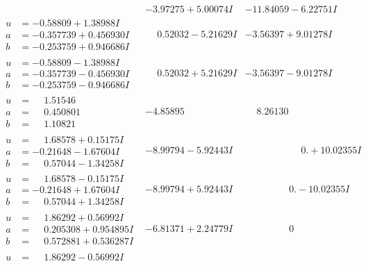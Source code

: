\documentclass[1p]{elsarticle_modified}
\theoremstyle{definition}
\begin{document}
$$\begin{array}{c|c|c}
 & -3.97275 + 5.00074 I & -11.84059 - 6.22751 I \\ \hline\begin{aligned}
u &= -0.58809 + 1.38988 I \\
a &= -0.357739 + 0.456930 I \\
b &= -0.253759 + 0.946686 I\end{aligned}
 & \phantom{-}0.52032 - 5.21629 I & -3.56397 + 9.01278 I \\ \hline\begin{aligned}
u &= -0.58809 - 1.38988 I \\
a &= -0.357739 - 0.456930 I \\
b &= -0.253759 - 0.946686 I\end{aligned}
 & \phantom{-}0.52032 + 5.21629 I & -3.56397 - 9.01278 I \\ \hline\begin{aligned}
u &= \phantom{-}1.51546\phantom{ +0.000000I} \\
a &= \phantom{-}0.450801\phantom{ +0.000000I} \\
b &= \phantom{-}1.10821\phantom{ +0.000000I}\end{aligned}
 & -4.85895\phantom{ +0.000000I} & \phantom{-}8.26130\phantom{ +0.000000I} \\ \hline\begin{aligned}
u &= \phantom{-}1.68578 + 0.15175 I \\
a &= -0.21648 - 1.67604 I \\
b &= \phantom{-}0.57044 - 1.34258 I\end{aligned}
 & -8.99794 - 5.92443 I & \phantom{-0.000000 -}0. + 10.02355 I \\ \hline\begin{aligned}
u &= \phantom{-}1.68578 - 0.15175 I \\
a &= -0.21648 + 1.67604 I \\
b &= \phantom{-}0.57044 + 1.34258 I\end{aligned}
 & -8.99794 + 5.92443 I & \phantom{-0.000000 } 0. - 10.02355 I \\ \hline\begin{aligned}
u &= \phantom{-}1.86292 + 0.56992 I \\
a &= \phantom{-}0.205308 + 0.954895 I \\
b &= \phantom{-}0.572881 + 0.536287 I\end{aligned}
 & -6.81371 + 2.24779 I & \phantom{-0.000000 } 0 \\ \hline\begin{aligned}
u &= \phantom{-}1.86292 - 0.56992 I \\

\end{aligned}
\end{array}$$
\end{document}
